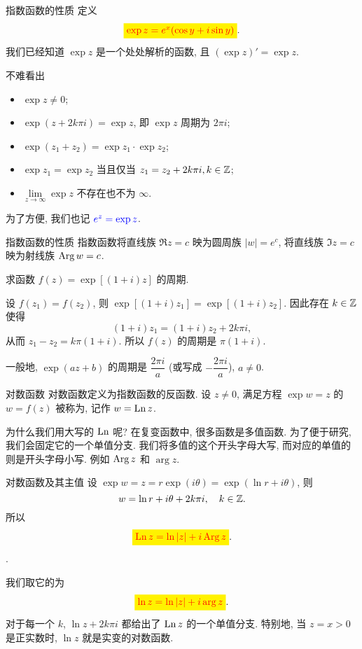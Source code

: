 \begin{frame}{指数函数的性质}
\onslide<+->
定义
\[\boxatt{$\exp z=e^x(\cos y+i\sin y)$}.\]
\onslide<+->
我们已经知道 $\exp z$ 是一个处处解析的函数, 且 $(\exp z)'=\exp z$.

\onslide<+->
不难看出
\begin{itemize}
\item $\exp z\neq 0$;
\item $\exp(z+2k\pi i)=\exp z$, 即 $\exp z$ 周期为 $2\pi i$;
\item $\exp(z_1+z_2)=\exp z_1\cdot \exp z_2$;
\item $\exp z_1=\exp z_2$ 当且仅当 $z_1=z_2+2k\pi i,k\in{\mathbb{Z}}$;
\item $\lim\limits_{z\to\infty}\exp z$ 不存在也不为 $\infty$.
\end{itemize}

\onslide<+->
为了方便, 我们也记 ${\color{blue}{e^z=\exp z}}$.
\end{frame}


\begin{frame}{指数函数的性质}
\onslide<+->
指数函数将直线族 $\Re z=c$ 映为圆周族 $|w|=e^c$, 
\onslide<+->
将直线族 $\Im z=c$ 映为射线族 $\operatorname{Arg} w=c$.
\begin{example}
求函数 $f(z)=\exp[(1+i)z]$ 的周期.
\end{example}
\begin{solution}
设 $f(z_1)=f(z_2)$, 则 $\exp[(1+i)z_1]=\exp[(1+i)z_2]$.
\onslide<+->
因此存在 $k\in{\mathbb{Z}}$ 使得
\[(1+i)z_1=(1+i)z_2+2k\pi i,\]
\onslide<+->
从而 $z_1-z_2=k\pi(1+i)$.
\onslide<+->
所以 $f(z)$ 的周期是 $\pi(1+i)$.
\end{solution}
\onslide<+->
一般地, $\exp(az+b)$ 的周期是 $\dfrac{2\pi i}a$ (或写成 $-\dfrac{2\pi i}a$), $a\neq 0$.
\end{frame}


\begin{frame}{对数函数}
\onslide<+->
对数函数定义为指数函数的反函数.
\onslide<+->
设 $z\neq 0$, 满足方程 $\exp w=z$ 的 $w=f(z)$ 被称为, 记作 $w=\operatorname{Ln} z$.

\onslide<+->
为什么我们用大写的 $\operatorname{Ln}$ 呢? 
\onslide<+->
在复变函数中, 很多函数是多值函数.
\onslide<+->
为了便于研究, 我们会固定它的一个单值分支.
\onslide<+->
我们将多值的这个开头字母大写, 而对应的单值的则是开头字母小写.
\onslide<+->
例如 $\operatorname{Arg} z$ 和 $\arg z$.
\end{frame}


\begin{frame}{对数函数及其主值}
\onslide<+->
设 $\exp w=z=r\exp (i\theta)=\exp(\ln r+i\theta)$,
\onslide<+->
则
\[w=\ln r+i\theta+2k\pi i,\quad k\in{\mathbb{Z}}.\]
\onslide<+->
所以
\[\boxatt{$\Ln z=\ln|z|+i\Arg z$}.\]
\onslide<+->
.

\onslide<+->
我们取它的为
\[\boxatt{$\ln z=\ln|z|+i\arg z$}.\]
\onslide<+->
对于每一个 $k$, $\ln z+2k\pi i$ 都给出了 $\operatorname{Ln} z$ 的一个单值分支.
\onslide<+->
特别地, 当 $z=x>0$ 是正实数时, $\ln z$ 就是实变的对数函数.
\end{frame}



